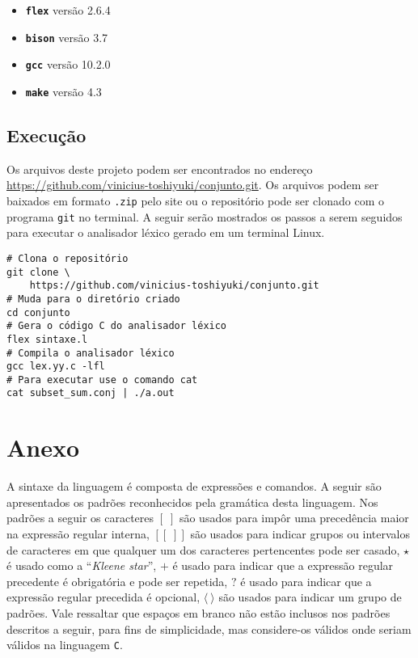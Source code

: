 \documentclass{llncs}
\begin{document}
\begin{itemize}
	\item \texttt{\bf flex} versão 2.6.4
	\item \texttt{\bf bison} versão 3.7
	\item \texttt{\bf gcc} versão 10.2.0
	\item \texttt{\bf make} versão 4.3
\end{itemize}

\subsection{Execução}

Os arquivos deste projeto podem ser encontrados no endereço \url{https://github.com/vinicius-toshiyuki/conjunto.git}. Os arquivos podem ser baixados em formato \texttt{.zip} pelo site ou o repositório pode ser clonado com o programa \texttt{git} no terminal. A seguir serão mostrados os passos a serem seguidos para executar o analisador léxico gerado em um terminal Linux.

\begin{verbatim}
# Clona o repositório
git clone \
	https://github.com/vinicius-toshiyuki/conjunto.git
# Muda para o diretório criado
cd conjunto
# Gera o código C do analisador léxico
flex sintaxe.l
# Compila o analisador léxico
gcc lex.yy.c -lfl
# Para executar use o comando cat
cat subset_sum.conj | ./a.out
\end{verbatim}

\nocite{*}


\newpage
\section{Anexo}
\newcommand\pat[1]{$\mathbf{#1}$}
\newcommand\tok[1]{\langle #1 \rangle}

A sintaxe da linguagem é composta de expressões e comandos. A seguir são apresentados os padrões reconhecidos pela gramática desta linguagem. Nos padrões a seguir os caracteres \pat{[\;]} são usados para impôr uma precedência maior na expressão regular interna, \pat{[[\;]]} são usados para indicar grupos ou intervalos de caracteres em que qualquer um dos caracteres pertencentes pode ser casado, $\star$ é usado como a ``\textit{Kleene star}'', $+$ é usado para indicar que a expressão regular precedente é obrigatória e pode ser repetida, $?$ é usado para indicar que a expressão regular precedida é opcional, \pat{\tok{\:}} são usados para indicar um grupo de padrões. Vale ressaltar que espaços em branco não estão inclusos nos padrões descritos a seguir, para fins de simplicidade, mas considere-os válidos onde seriam válidos na linguagem \texttt{C}.
\end{document}
